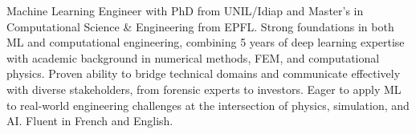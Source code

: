 


\begin{cvparagraph}
Machine Learning Engineer with PhD from UNIL/Idiap and Master's in Computational Science \& Engineering from EPFL. Strong foundations in both ML and computational engineering, combining 5 years of deep learning expertise with academic background in numerical methods, FEM, and computational physics. Proven ability to bridge technical domains and communicate effectively with diverse stakeholders, from forensic experts to investors. Eager to apply ML to real-world engineering challenges at the intersection of physics, simulation, and AI. Fluent in French and English.
\end{cvparagraph}
